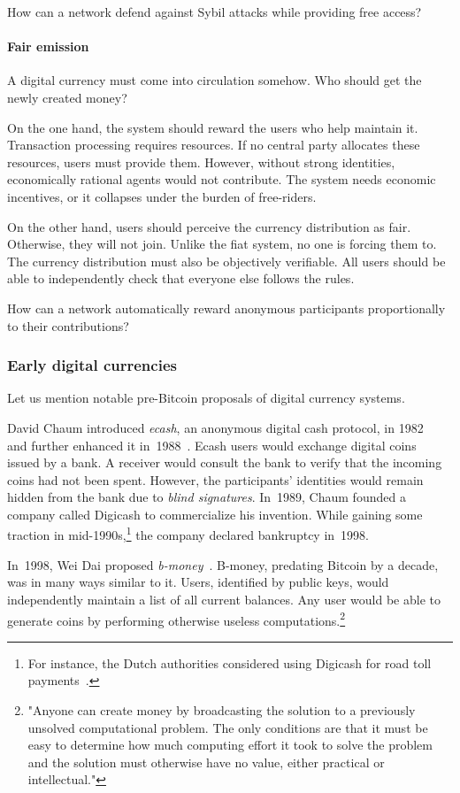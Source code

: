 How can a network defend against Sybil attacks while providing free access?


\paragraph{Fair emission}

A digital currency must come into circulation somehow.
Who should get the newly created money?

On the one hand, the system should reward the users who help maintain it.
Transaction processing requires resources.
If no central party allocates these resources, users must provide them.
However, without strong identities, economically rational agents would not contribute.
The system needs economic incentives, or it collapses under the burden of free-riders.

On the other hand, users should perceive the currency distribution as fair.
Otherwise, they will not join.
Unlike the fiat system, no one is forcing them to.
The currency distribution must also be objectively verifiable.
All users should be able to independently check that everyone else follows the rules.

How can a network automatically reward anonymous participants proportionally to their contributions?


\subsubsection*{Early digital currencies}

Let us mention notable pre-Bitcoin proposals of digital currency systems.

David Chaum introduced \textit{ecash}, an anonymous digital cash protocol, in 1982~\cite{Chaum1982} and further enhanced it in~1988~\cite{Chaum1988}.
Ecash users would exchange digital coins issued by a bank.
A receiver would consult the bank to verify that the incoming coins had not been spent.
However, the participants' identities would remain hidden from the bank due to \textit{blind signatures}.
In~1989, Chaum founded a company called Digicash to commercialize his invention.
While gaining some traction in mid-1990s,\footnote{For instance, the Dutch authorities considered using Digicash for road toll payments~\cite{Chaum2019}.} the company declared bankruptcy in~1998.

In~1998, Wei Dai proposed \textit{b-money}~\cite{Dai1998}.
B-money, predating Bitcoin by a decade, was in many ways similar to it.
Users, identified by public keys, would independently maintain a list of all current balances.
Any user would be able to generate coins by performing otherwise useless computations.\footnote{"Anyone can create money by broadcasting the solution to a previously unsolved computational problem. The only conditions are that it must be easy to determine how much computing effort it took to solve the problem and the solution must otherwise have no value, either practical or intellectual."}

